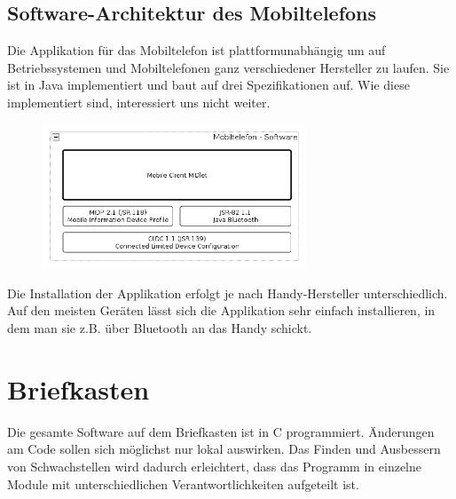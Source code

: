 \documentclass[ngerman]{article}
\begin{document}
\subsection{Software-Architektur des Mobiltelefons}

Die Applikation für das Mobiltelefon ist plattformunabhängig um auf
Betriebssystemen und Mobiltelefonen ganz verschiedener Hersteller zu laufen. Sie
ist in Java implementiert und baut auf drei Spezifikationen auf. Wie diese
implementiert sind, interessiert uns nicht weiter.

\begin{figure}[h!] \begin{center}
    \includegraphics[width=0.7\textwidth]{media/mobile-client-arch}
\end{center} \end{figure}

Die Installation der Applikation erfolgt je nach Handy-Hersteller
unterschiedlich. Auf den meisten Geräten lässt sich die Applikation sehr
einfach installieren, in dem man sie z.B. über Bluetooth an das Handy schickt.


\section{Briefkasten}

Die gesamte Software auf dem Briefkasten ist in C programmiert. Änderungen am
Code sollen sich möglichst nur lokal auswirken. Das Finden und Ausbessern von
Schwachstellen wird dadurch erleichtert, dass das Programm in einzelne Module
mit unterschiedlichen Verantwortlichkeiten aufgeteilt ist.
\end{document}
